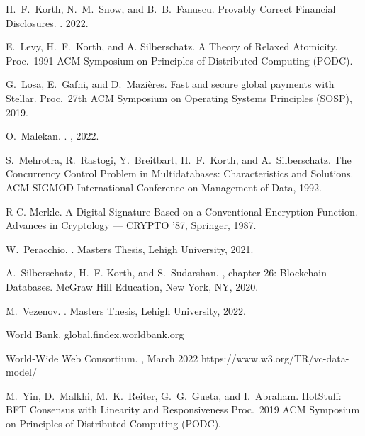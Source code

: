 \documentclass[11pt,dvipdfm]{article}
\begin{document}
\begin{thebibliography}{10}
\begin{small}
 H.\ F.\ Korth, N.\ M.\ Snow, and B.\ B.\ Fanuscu.
\newblock Provably Correct Financial Disclosures.
. 2022.

	E.\ Levy, H.\ F.\ Korth, and A. Silberschatz.
	\newblock A Theory of Relaxed Atomicity.
	\newblock Proc.\  1991 ACM Symposium on Principles of Distributed Computing (PODC).

	G.\ Losa, E.\  Gafni, and D.\ Mazi\`eres.
	\newblock Fast and secure global payments with {S}tellar.
	\newblock Proc.\ 27th ACM Symposium on Operating Systems Principles (SOSP),
	2019.
	

 O.~Malekan.
                . , 2022.

	S.\ Mehrotra,
               R.\ Rastogi,
               Y.\ Breitbart,
               H.\ F.\ Korth, and
               A.\ Silberschatz.
               \newblock The Concurrency Control Problem in Multidatabases: Characteristics
               and Solutions.
               \newblock ACM SIGMOD International Conference on
               Management of Data, 1992.
               
	R C. Merkle.
	\newblock A Digital Signature Based on a Conventional Encryption Function.
	\newblock Advances in Cryptology --- CRYPTO '87, Springer,
	1987.
	
	W.\ Peracchio.
	.
	\newblock Masters Thesis, Lehigh University, 2021.

A.~Silberschatz, H.~F. Korth, and S.~Sudarshan.
, chapter 26: Blockchain
  Databases.
\newblock McGraw Hill Education, New York, NY, 2020.

	M.\ Vezenov.
	.
	\newblock Masters Thesis, Lehigh University, 2022.
	
	World Bank.
	\newblock global.findex.worldbank.org
	               
	 World-Wide Web Consortium.
	, March 2022
	\newblock https://www.w3.org/TR/vc-data-model/
	
	M.\ Yin, D.\ Malkhi, M.\ K.\ Reiter, G.\ G.\ Gueta, and I.\ Abraham.
	\newblock HotStuff: BFT Consensus with Linearity and Responsiveness
	\newblock Proc.\  2019 ACM Symposium on Principles of Distributed Computing (PODC).


\end{small}
\end{thebibliography}
\end{document}
